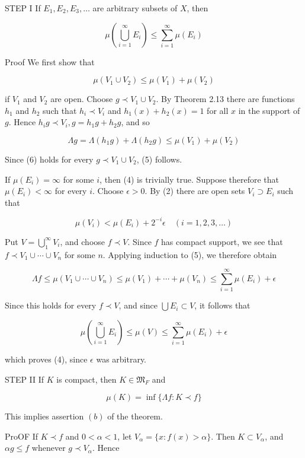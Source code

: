 \documentclass[10pt]{article}
\begin{document}
STEP I If $E_{1}, E_{2}, E_{3}, \ldots$ are arbitrary subsets of $X$, then

$$
\mu\left(\bigcup_{i=1}^{\infty} E_{i}\right) \leq \sum_{i=1}^{\infty} \mu\left(E_{i}\right)
$$

Proof We first show that

$$
\mu\left(V_{1} \cup V_{2}\right) \leq \mu\left(V_{1}\right)+\mu\left(V_{2}\right)
$$

if $V_{1}$ and $V_{2}$ are open. Choose $g \prec V_{1} \cup V_{2}$. By Theorem 2.13 there are functions $h_{1}$ and $h_{2}$ such that $h_{i} \prec V_{i}$ and $h_{1}(x)+h_{2}(x)=1$ for all $x$ in the support of $g$. Hence $h_{i} g \prec V_{i}, g=h_{1} g+h_{2} g$, and so

$$
\Lambda g=\Lambda\left(h_{1} g\right)+\Lambda\left(h_{2} g\right) \leq \mu\left(V_{1}\right)+\mu\left(V_{2}\right)
$$

Since (6) holds for every $g \prec V_{1} \cup V_{2}$, (5) follows.

If $\mu\left(E_{i}\right)=\infty$ for some $i$, then (4) is trivially true. Suppose therefore that $\mu\left(E_{i}\right)<\infty$ for every $i$. Choose $\epsilon>0$. By (2) there are open sets $V_{i} \supset E_{i}$ such that

$$
\mu\left(V_{i}\right)<\mu\left(E_{i}\right)+2^{-i} \epsilon \quad(i=1,2,3, \ldots)
$$

Put $V=\bigcup_{1}^{\infty} V_{i}$, and choose $f \prec V$. Since $f$ has compact support, we see that $f \prec V_{1} \cup \cdots \cup V_{n}$ for some $n$. Applying induction to (5), we therefore obtain

$$
\Lambda f \leq \mu\left(V_{1} \cup \cdots \cup V_{n}\right) \leq \mu\left(V_{1}\right)+\cdots+\mu\left(V_{n}\right) \leq \sum_{i=1}^{\infty} \mu\left(E_{i}\right)+\epsilon
$$

Since this holds for every $f \prec V$, and since $\bigcup E_{i} \subset V$, it follows that

$$
\mu\left(\bigcup_{i=1}^{\infty} E_{i}\right) \leq \mu(V) \leq \sum_{i=1}^{\infty} \mu\left(E_{i}\right)+\epsilon
$$

which proves (4), since $\epsilon$ was arbitrary.

STEP II If $K$ is compact, then $K \in \mathfrak{M}_{F}$ and

$$
\mu(K)=\inf \{\Lambda f: K \prec f\}
$$

This implies assertion $(b)$ of the theorem.

ProOF If $K \prec f$ and $0<\alpha<1$, let $V_{\alpha}=\{x: f(x)>\alpha\}$. Then $K \subset V_{\alpha}$, and $\alpha g \leq f$ whenever $g \prec V_{\alpha}$. Hence
\end{document}
